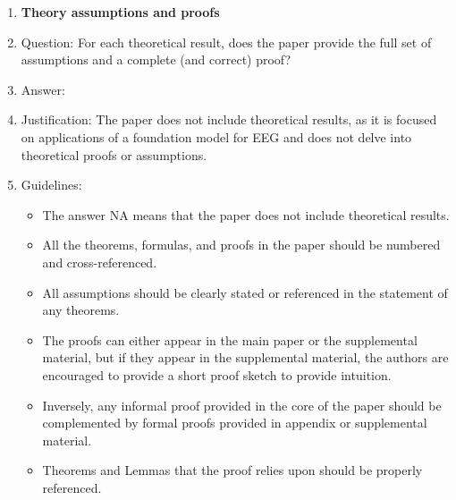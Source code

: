 \documentclass{article}
\begin{document}
\begin{enumerate}
\begin{itemize}
        \item If applicable, the authors should discuss possible limitations of their approach to address problems of privacy and fairness.
        \item While the authors might fear that complete honesty about limitations might be used by reviewers as grounds for rejection, a worse outcome might be that reviewers discover limitations that aren't acknowledged in the paper. The authors should use their best judgment and recognize that individual actions in favor of transparency play an important role in developing norms that preserve the integrity of the community. Reviewers will be specifically instructed to not penalize honesty concerning limitations.
    \end{itemize}


\item {\bf Theory assumptions and proofs}
    \item[] Question: For each theoretical result, does the paper provide the full set of assumptions and a complete (and correct) proof?
    \item[] Answer: \answerNA{} %
    \item[] Justification: The paper does not include theoretical results, as it is focused on applications of a foundation model for EEG and does not delve into theoretical proofs or assumptions.
    \item[] Guidelines:
    \begin{itemize}
        \item The answer NA means that the paper does not include theoretical results. 
        \item All the theorems, formulas, and proofs in the paper should be numbered and cross-referenced.
        \item All assumptions should be clearly stated or referenced in the statement of any theorems.
        \item The proofs can either appear in the main paper or the supplemental material, but if they appear in the supplemental material, the authors are encouraged to provide a short proof sketch to provide intuition. 
        \item Inversely, any informal proof provided in the core of the paper should be complemented by formal proofs provided in appendix or supplemental material.
        \item Theorems and Lemmas that the proof relies upon should be properly referenced. 
    \end{itemize}


\end{enumerate}
\end{document}
